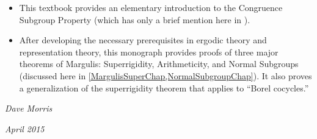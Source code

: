 \begin{itemize}
	\item[\cite{Sury-CSP}] This textbook provides an elementary introduction to the Congruence Subgroup Property (which has only a brief mention here in ).

	\item[\cite{ZimmerBook}] After developing the necessary prerequisites in ergodic theory and representation theory, this monograph provides proofs of three major theorems of Margulis: Superrigidity, Arithmeticity, and Normal Subgroups (discussed here in \cref{MargulisSuperChap,NormalSubgroupChap}). It also proves a generalization of the superrigidity theorem that applies to ``Borel cocycles\zz.''
	
	\end{itemize}

\medskip

\hfill \textit{Dave Morris}


 \hfill \textit{April 2015} %




 \newpage

\putintocfalse %
\makemarksfalse %

